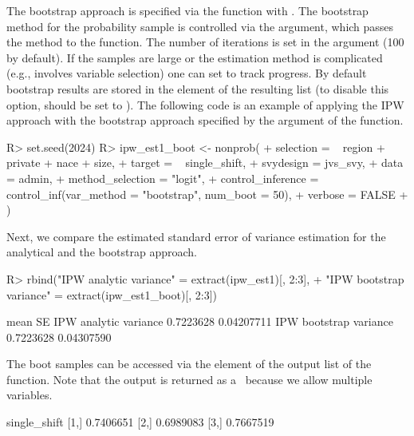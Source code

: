 \documentclass[nojss]{jss}
\begin{document}
The bootstrap approach is specified via the 
function with . The bootstrap method for
the probability sample is controlled via the  argument,
which passes the method to the  function. The
number of iterations is set in the  argument (100 by
default). If the samples are large or the estimation method is
complicated (e.g., involves variable selection) one can set
 to track progress. By default bootstrap results
are stored in the  element of the resulting list (to
disable this option,  should be set to ).
The following code is an example of applying the IPW approach with the
bootstrap approach specified by the argument  of
the  function.

\begin{CodeChunk}
\begin{CodeInput}
R> set.seed(2024)
R> ipw_est1_boot <- nonprob(
+   selection = ~ region + private + nace + size,
+   target = ~ single_shift,
+   svydesign = jvs_svy,
+   data = admin,
+   method_selection = "logit",
+   control_inference = control_inf(var_method = "bootstrap", num_boot = 50),
+   verbose = FALSE
+ )
\end{CodeInput}
\end{CodeChunk}

Next, we compare the estimated standard error of variance estimation for
the analytical and the bootstrap approach.

\begin{CodeChunk}
\begin{CodeInput}
R> rbind("IPW analytic variance"  = extract(ipw_est1)[, 2:3],
+       "IPW bootstrap variance" = extract(ipw_est1_boot)[, 2:3])
\end{CodeInput}
\begin{CodeOutput}
                            mean         SE
IPW analytic variance  0.7223628 0.04207711
IPW bootstrap variance 0.7223628 0.04307590
\end{CodeOutput}
\end{CodeChunk}

The boot samples can be accessed via the  element of
the output list of the  function. Note that the output
is returned as a~ because we allow multiple 
variables.

\begin{CodeChunk}
\begin{CodeOutput}
     single_shift
[1,]    0.7406651
[2,]    0.6989083
[3,]    0.7667519
\end{CodeOutput}
\end{CodeChunk}
\end{document}
